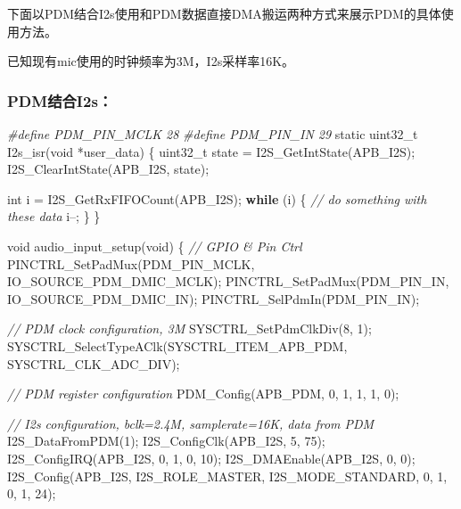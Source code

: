 \documentclass[
  12pt,
]{book}
\newenvironment{Shaded}{\begin{snugshade}}{\end{snugshade}}
\newcommand{\CommentTok}[1]{\textcolor[rgb]{0.56,0.35,0.01}{\textit{#1}}}
\newcommand{\ControlFlowTok}[1]{\textcolor[rgb]{0.13,0.29,0.53}{\textbf{#1}}}
\newcommand{\DataTypeTok}[1]{\textcolor[rgb]{0.13,0.29,0.53}{#1}}
\newcommand{\DecValTok}[1]{\textcolor[rgb]{0.00,0.00,0.81}{#1}}
\newcommand{\NormalTok}[1]{#1}
\newcommand{\PreprocessorTok}[1]{\textcolor[rgb]{0.56,0.35,0.01}{\textit{#1}}}
\begin{document}
下面以PDM结合I2s使用和PDM数据直接DMA搬运两种方式来展示PDM的具体使用方法。

已知现有mic使用的时钟频率为3M，I2s采样率16K。

\hypertarget{pdmux7ed3ux5408i2s}{%
\subsubsection{PDM结合I2s：}\label{pdmux7ed3ux5408i2s}}

\begin{Shaded}
\begin{Highlighting}[]
\PreprocessorTok{#define PDM_PIN_MCLK        28}
\PreprocessorTok{#define PDM_PIN_IN          29}
\DataTypeTok{static} \DataTypeTok{uint32_t}\NormalTok{ I2s_isr(}\DataTypeTok{void}\NormalTok{ *user_data)}
\NormalTok{\{ }
    \DataTypeTok{uint32_t}\NormalTok{ state = I2S_GetIntState(APB_I2S);}
\NormalTok{    I2S_ClearIntState(APB_I2S, state);}

    \DataTypeTok{int}\NormalTok{ i = I2S_GetRxFIFOCount(APB_I2S);}
    \ControlFlowTok{while}\NormalTok{ (i) \{}
        \CommentTok{// do something with these data}
\NormalTok{        i--;}
\NormalTok{    \}}
\NormalTok{\}}

\DataTypeTok{void}\NormalTok{ audio_input_setup(}\DataTypeTok{void}\NormalTok{)}
\NormalTok{\{}
    \CommentTok{// GPIO & Pin Ctrl}
\NormalTok{    PINCTRL_SetPadMux(PDM_PIN_MCLK, IO_SOURCE_PDM_DMIC_MCLK);}
\NormalTok{    PINCTRL_SetPadMux(PDM_PIN_IN, IO_SOURCE_PDM_DMIC_IN);}
\NormalTok{    PINCTRL_SelPdmIn(PDM_PIN_IN);}

    \CommentTok{// PDM clock configuration, 3M}
\NormalTok{    SYSCTRL_SetPdmClkDiv(}\DecValTok{8}\NormalTok{, }\DecValTok{1}\NormalTok{);}
\NormalTok{    SYSCTRL_SelectTypeAClk(SYSCTRL_ITEM_APB_PDM, SYSCTRL_CLK_ADC_DIV);}
    
    \CommentTok{// PDM register configuration}
\NormalTok{    PDM_Config(APB_PDM, }\DecValTok{0}\NormalTok{, }\DecValTok{1}\NormalTok{, }\DecValTok{1}\NormalTok{, }\DecValTok{1}\NormalTok{, }\DecValTok{0}\NormalTok{);    }

    \CommentTok{// I2s configuration, bclk=2.4M, samplerate=16K, data from PDM}
\NormalTok{    I2S_DataFromPDM(}\DecValTok{1}\NormalTok{);    }
\NormalTok{    I2S_ConfigClk(APB_I2S, }\DecValTok{5}\NormalTok{, }\DecValTok{75}\NormalTok{);}
\NormalTok{    I2S_ConfigIRQ(APB_I2S, }\DecValTok{0}\NormalTok{, }\DecValTok{1}\NormalTok{, }\DecValTok{0}\NormalTok{, }\DecValTok{10}\NormalTok{);}
\NormalTok{    I2S_DMAEnable(APB_I2S, }\DecValTok{0}\NormalTok{, }\DecValTok{0}\NormalTok{);    }
\NormalTok{    I2S_Config(APB_I2S, I2S_ROLE_MASTER, I2S_MODE_STANDARD, }\DecValTok{0}\NormalTok{, }\DecValTok{1}\NormalTok{, }\DecValTok{0}\NormalTok{, }\DecValTok{1}\NormalTok{, }\DecValTok{24}\NormalTok{);}
    

\end{Highlighting}
\end{Shaded}
\end{document}
